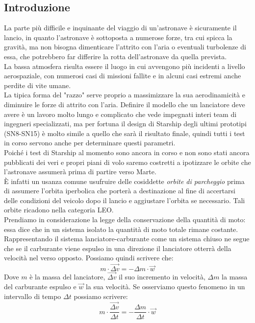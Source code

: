 \subsection{Introduzione}
La parte più difficile e inquinante del viaggio di un'astronave è sicuramente il lancio, in quanto l'astronave è sottoposta a numerose forze, tra cui spicca la gravità, ma non bisogna dimenticare l'attrito con l'aria o eventuali turbolenze di essa, che potrebbero far differire la rotta dell'astronave da quella prevista.\\ 
La bassa atmosfera risulta essere il luogo in cui avvengono più incidenti a livello aerospaziale, con numerosi casi di missioni fallite e in alcuni casi estremi anche perdite di vite umane.\\
La tipica forma del "razzo" serve proprio a massimizzare la sua aerodinamicità e diminuire le forze di attrito con l'aria. Definire il modello che un lanciatore deve avere è un lavoro molto lungo e complicato che vede impegnati interi team di ingegneri specializzati, ma per fortuna il design di Starship degli ultimi prototipi (SN8-SN15) è molto simile a quello che sarà il risultato finale, quindi tutti i test in corso servono anche per determinare questi parametri.\\
Poiché i test di Starship al momento sono ancora in corso e non sono stati ancora pubblicati dei veri e propri piani di volo saremo costretti a ipotizzare le orbite che l'astronave assumerà prima di partire verso Marte.\\
È infatti un usanza comune usufruire delle cosiddette \textit{orbite di parcheggio} prima di assumere l'orbita iperbolica che porterà a destinazione al fine di accertarsi delle condizioni del veicolo dopo il lancio e aggiustare l'orbita se necessario. Tali orbite ricadono nella categoria LEO.\\
Prendiamo in considerazione la legge della conservazione della quantità di moto: essa dice che in un sistema isolato la quantità di moto totale rimane costante. Rappresentando il sistema lanciatore-carburante come un sistema chiuso ne segue che se il carburante viene espulso in una direzione il lanciatore otterrà della velocità nel verso opposto.
Possiamo quindi scrivere che:
$$
m \cdot \Vec{\Delta v} = - \Delta m \cdot \Vec{w}
$$
Dove $m$ è la massa del lanciatore, $\Vec{\Delta v}$ il suo incremento in velocità, $\Delta m$ la massa del carburante espulso e $\Vec{w}$ la sua velocità.
Se osserviamo questo fenomeno in un intervallo di tempo $\Delta t$ possiamo scrivere:
$$
m \cdot \frac{\Vec{\Delta v}}{\Delta t} = - \frac{\Delta m}{\Delta t} \cdot \Vec{w}
$$

